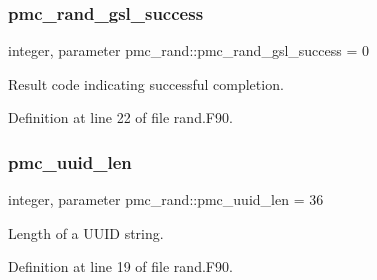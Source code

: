 \subsubsection{\texorpdfstring{pmc\+\_\+rand\+\_\+gsl\+\_\+success}{pmc\_rand\_gsl\_success}}
{\footnotesize\ttfamily integer, parameter pmc\+\_\+rand\+::pmc\+\_\+rand\+\_\+gsl\+\_\+success = 0}



Result code indicating successful completion. 



Definition at line 22 of file rand.\+F90.

\mbox{\label{namespacepmc__rand_a50eda03f05afa1016ef7c63910f62abf}} 
\subsubsection{\texorpdfstring{pmc\+\_\+uuid\+\_\+len}{pmc\_uuid\_len}}
{\footnotesize\ttfamily integer, parameter pmc\+\_\+rand\+::pmc\+\_\+uuid\+\_\+len = 36}



Length of a U\+U\+ID string. 



Definition at line 19 of file rand.\+F90.


